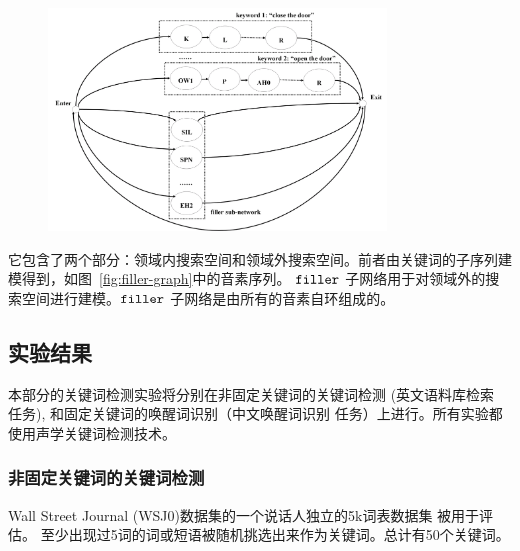 \begin{figure}[!htp]
  \centering
    \captionstyle{\centering}
    \includegraphics[width=0.8\textwidth]{figure/filler-graph.png}
\end{figure}


它包含了两个部分：领域内搜索空间和领域外搜索空间。前者由关键词的子序列建模得到，如图~\ref{fig:filler-graph}中的音素序列。 $\tt filler$ 子网络用于对领域外的搜索空间进行建模。$\tt filler$ 子网络是由所有的音素自环组成的。


\subsection{实验结果}
\label{chap:kws-exp}


本部分的关键词检测实验将分别在非固定关键词的关键词检测 (英文语料库检索 任务), 和固定关键词的唤醒词识别（中文唤醒词识别 任务）上进行。所有实验都使用声学关键词检测技术。

\subsubsection{非固定关键词的关键词检测}
\label{Sec:exp-sp-docu-detri}

Wall Street Journal (WSJ0)数据集的一个说话人独立的5k词表数据集 \cite{garofalo1993continous} 被用于评估。 至少出现过5词的词或短语被随机挑选出来作为关键词。总计有50个关键词。


